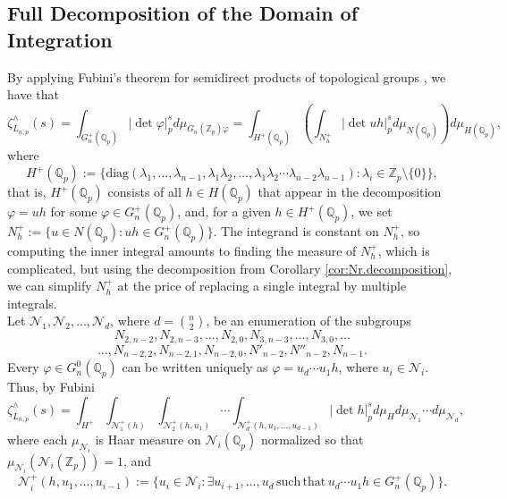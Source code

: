 \documentclass{article}
\begin{document}
\subsection{Full Decomposition of the Domain of Integration}
By applying Fubini's theorem for semidirect products of topological groups \cite[Proposition 28]{Nachbin}, we have that \[\zeta_{L_{n,p}}^{\wedge}(s)=\displaystyle\int_{G_{n}^{+}(\mathbb{Q}_p)}|\det{\varphi}|_p^sd\mu_{G_{n}(\mathbb{Z}_p)\varphi}=\displaystyle\int_{H^+(\mathbb{Q}_p)}\left(\displaystyle\int_{N_{h}^+}|\det{uh}|_p^sd\mu_{N(\mathbb{Q}_p)}\right)d\mu_{H(\mathbb{Q}_p)},\]
where \[H^+(\mathbb{Q}_p):=\{\mathrm{diag}(\lambda_{1},\dots,\lambda_{n-1},\lambda_{1}\lambda_{2},\dots,\lambda_{1}\lambda_{2}\cdots\lambda_{n-2}\lambda_{n-1}) : \lambda_{i}\in\mathbb{Z}_{p}\setminus\{0\}\},\]
that is, $H^+(\mathbb{Q}_p)$ consists of all $h\in{H(\mathbb{Q}_{p})}$ that appear in the decomposition $\varphi=uh$ for some $\varphi\in{G_{n}^{+}(\mathbb{Q}_{p})}$, and, for a given $h\in{H^{+}(\mathbb{Q}_{p})}$, we set $N_{h}^{+}:=\{u\in{N(\mathbb{Q}_{p}) : uh\in{G_{n}^{+}(\mathbb{Q}_{p})}}\}$. The integrand is constant on $N_{h}^{+}$, so computing the inner integral amounts to finding the measure of $N_{h}^+$, which is complicated, but using the decomposition from Corollary \ref{cor:Nr.decomposition}, we can simplify $N_{h}^{+}$ at the price of replacing a single integral by multiple integrals.\\
Let $\mathcal{N}_{1},\mathcal{N}_{2},\dots,\mathcal{N}_{d}$, where $d=\binom{n}{2}$, be an enumeration of the subgroups
\[N_{2,n-2},N_{2,n-3},\dots,N_{2,0},N_{3,n-3},\dots,N_{3,0},\dots\]\[\dots,N_{n-2,2},N_{n-2,1},N_{n-2,0},N'_{n-2},N''_{n-2},N_{n-1}.\]
Every $\varphi\in{G_{n}^{0}(\mathbb{Q}_{p})}$ can be written uniquely as $\varphi=u_{d}\cdots{u_{1}h}$, where $u_{i}\in{\mathcal{N}_{i}}$. Thus, by Fubini \[
\zeta_{L_{n,p}}^{\wedge}(s)=\displaystyle\int_{H^{+}}\displaystyle\int_{\mathcal{N}_{1}^{+}(h)}\displaystyle\int_{\mathcal{N}_{2}^{+}(h,u_{1})}\cdots\displaystyle\int_{\mathcal{N}_{d}^{+}(h,u_{1},\dots,u_{d-1})}|\det{h}|_{p}^{s}d\mu_{H}d\mu_{\mathcal{N}_{1}}\cdots{d\mu_{\mathcal{N}_d}},\]
where each $\mu_{\mathcal{N}_{i}}$ is Haar measure on $\mathcal{N}_{i}(\mathbb{Q}_{p})$ normalized so that\\ $\mu_{\mathcal{N}_{i}}(\mathcal{N}_{i}(\mathbb{Z}_{p}))=1$, and \[\mathcal{N}_{i}^{+}(h,u_{1},\dots,u_{i-1}):=\{u_{i}\in\mathcal{N}_{i} : \exists{u_{i+1},\dots,u_d}\,\mathrm{such}\,\mathrm{that}\,u_d\cdots{u_{1}}h\in{G_{n}^{+}(\mathbb{Q}_{p})}\}.\]
\end{document}
